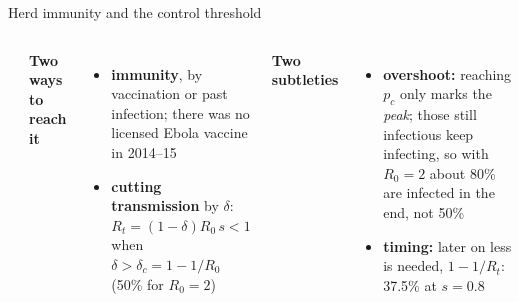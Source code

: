 \begin{frame}{Herd immunity and the control threshold}
\begin{columns}[T,onlytextwidth]
\begin{itemize}
  \end{itemize}
  \textbf{\color{mvPINN}Two ways to reach it}
  \begin{itemize}\setlength{\itemsep}{0pt}
    \item \textbf{immunity}, by vaccination or past infection; there was no licensed Ebola vaccine in 2014--15
    \item \textbf{cutting transmission} by $\delta$: $R_t = (1-\delta) R_0\, s < 1$ when $\delta > \delta_c = 1 - 1/R_0$ (50\% for $R_0 = 2$)
  \end{itemize}
  \textbf{\color{mvPINN}Two subtleties}
  \begin{itemize}\setlength{\itemsep}{0pt}
    \item \textbf{overshoot:} reaching $p_c$ only marks the \emph{peak}; those still infectious keep infecting, so with $R_0 = 2$ about 80\% are infected in the end, not 50\%
    \item \textbf{timing:} later on less is needed, $1 - 1/R_t$: 37.5\% at $s = 0.8$
  \end{itemize}
\end{columns}
\end{frame}
